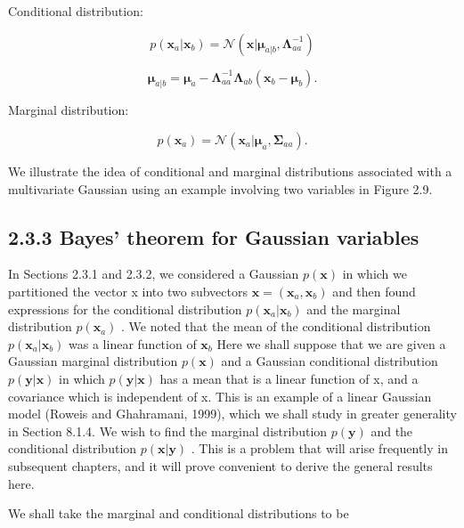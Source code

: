 \documentclass[
  10
]{article}
\begin{document}
Conditional distribution:

\[
{p (\mathbf {x} _ {a} | \mathbf {x} _ {b})} = {\mathcal {N} (\mathbf {x} | \pmb {\mu} _ {a | b}, \pmb {\Lambda} _ {a a} ^ {- 1})}\tag{2.96}
\]

\[
{\pmb {\mu} _ {a | b}} = {\pmb {\mu} _ {a} - \pmb {\Lambda} _ {a a} ^ {- 1} \pmb {\Lambda} _ {a b} (\mathbf {x} _ {b} - \pmb {\mu} _ {b}).}\tag{2.97}
\]

Marginal distribution:

\[
p (\mathbf {x} _ {a}) = \mathcal {N} (\mathbf {x} _ {a} | \boldsymbol {\mu} _ {a}, \boldsymbol {\Sigma} _ {a a}).\tag{2.98}
\]

We illustrate the idea of conditional and marginal distributions
associated with a multivariate Gaussian using an example involving two
variables in Figure 2.9.

\subsection{2.3.3 Bayes' theorem for Gaussian
variables}\label{bayes-theorem-for-gaussian-variables}

In Sections 2.3.1 and 2.3.2, we considered a Gaussian
\(p ( \mathbf { x } )\) in which we partitioned the vector x into two
subvectors
\(\mathbf { x } = \left( \mathbf { x } _ { a } , \mathbf { x } _ { b } \right)\)
and then found expressions for the conditional distribution
\(p ( \mathbf { x } _ { a } | \mathbf { x } _ { b } )\) and the marginal
distribution \(p ( \mathbf { x } _ { a } )\) . We noted that the mean of
the conditional distribution
\(p ( \mathbf { x } _ { a } | \mathbf { x } _ { b } )\) was a linear
function of \(\mathbf { x } _ { b }\) Here we shall suppose that we are
given a Gaussian marginal distribution \(p ( \mathbf { x } )\) and a
Gaussian conditional distribution
\(p ( \mathbf { y } \vert \mathbf { x } )\) in which
\(p ( \mathbf { y } \vert \mathbf { x } )\) has a mean that is a linear
function of x, and a covariance which is independent of x. This is an
example of a linear Gaussian model (Roweis and Ghahramani, 1999), which
we shall study in greater generality in Section 8.1.4. We wish to find
the marginal distribution \(p ( \mathbf { y } )\) and the conditional
distribution \(p ( \mathbf { x } | \mathbf { y } )\) . This is a problem
that will arise frequently in subsequent chapters, and it will prove
convenient to derive the general results here.

We shall take the marginal and conditional distributions to be
\end{document}
